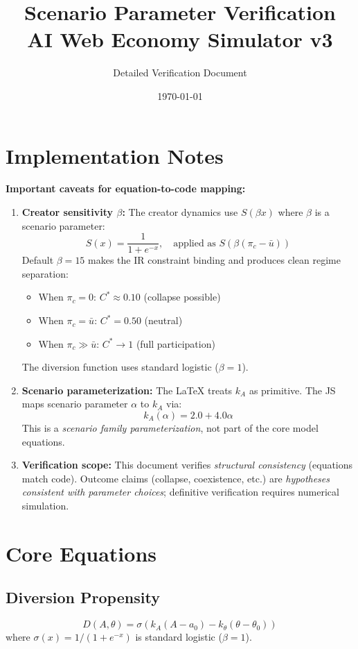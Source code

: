 \documentclass[11pt]{article}
\title{Scenario Parameter Verification\\
\large AI Web Economy Simulator v3}
\author{Detailed Verification Document}
\date{\today}
\begin{document}
\maketitle

\section{Implementation Notes}

\textbf{Important caveats for equation-to-code mapping:}

\begin{enumerate}
    \item \textbf{Creator sensitivity $\beta$:} The creator dynamics use $S(\beta x)$ where $\beta$ is a scenario parameter:
    \[
    S(x) = \frac{1}{1+e^{-x}}, \quad \text{applied as } S(\beta(\pi_c - \bar{u}))
    \]
    Default $\beta=15$ makes the IR constraint binding and produces clean regime separation:
    \begin{itemize}
        \item When $\pi_c = 0$: $C^* \approx 0.10$ (collapse possible)
        \item When $\pi_c = \bar{u}$: $C^* = 0.50$ (neutral)
        \item When $\pi_c \gg \bar{u}$: $C^* \to 1$ (full participation)
    \end{itemize}

    The diversion function uses standard logistic ($\beta=1$).

    \item \textbf{Scenario parameterization:} The LaTeX treats $k_A$ as primitive. The JS maps scenario parameter $\alpha$ to $k_A$ via:
    \[
    k_A(\alpha) = 2.0 + 4.0\alpha
    \]
    This is a \textit{scenario family parameterization}, not part of the core model equations.

    \item \textbf{Verification scope:} This document verifies \textit{structural consistency} (equations match code). Outcome claims (collapse, coexistence, etc.) are \textit{hypotheses consistent with parameter choices}; definitive verification requires numerical simulation.
\end{enumerate}

\section{Core Equations}

\subsection{Diversion Propensity}
\[
D(A, \theta) = \sigma(k_A(A - a_0) - k_\theta(\theta - \theta_0))
\]
where $\sigma(x) = 1/(1+e^{-x})$ is standard logistic ($\beta=1$).
\end{document}
